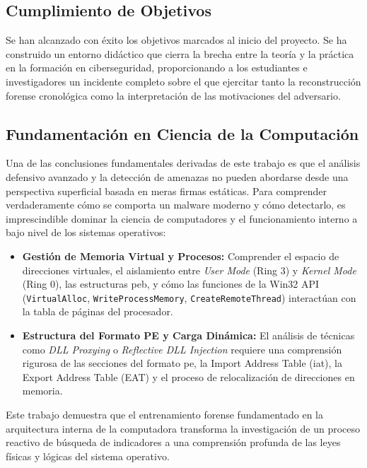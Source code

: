 \subsection{Cumplimiento de Objetivos}

Se han alcanzado con éxito los objetivos marcados al inicio del proyecto. Se ha construido un entorno didáctico que cierra la brecha entre la teoría y la práctica en la formación en ciberseguridad, proporcionando a los estudiantes e investigadores un incidente completo sobre el que ejercitar tanto la reconstrucción forense cronológica como la interpretación de las motivaciones del adversario.

\subsection{Fundamentación en Ciencia de la Computación}

Una de las conclusiones fundamentales derivadas de este trabajo es que el análisis defensivo avanzado y la detección de amenazas no pueden abordarse desde una perspectiva superficial basada en meras firmas estáticas. Para comprender verdaderamente cómo se comporta un malware moderno y cómo detectarlo, es imprescindible dominar la ciencia de computadores y el funcionamiento interno a bajo nivel de los sistemas operativos:

\begin{itemize}
    \item \textbf{Gestión de Memoria Virtual y Procesos:} Comprender el espacio de direcciones virtuales, el aislamiento entre \textit{User Mode} (Ring 3) y \textit{Kernel Mode} (Ring 0), las estructuras \acrshort{peb}, y cómo las funciones de la Win32 API (\texttt{VirtualAlloc}, \texttt{WriteProcessMemory}, \texttt{CreateRemoteThread}) interactúan con la tabla de páginas del procesador.
    
    \item \textbf{Estructura del Formato PE y Carga Dinámica:} El análisis de técnicas como \textit{DLL Proxying} o \textit{Reflective DLL Injection} requiere una comprensión rigurosa de las secciones del formato \acrshort{pe}, la Import Address Table (\acrshort{iat}), la Export Address Table (EAT) y el proceso de relocalización de direcciones en memoria.
\end{itemize}

Este trabajo demuestra que el entrenamiento forense fundamentado en la arquitectura interna de la computadora transforma la investigación de un proceso reactivo de búsqueda de indicadores a una comprensión profunda de las leyes físicas y lógicas del sistema operativo.

